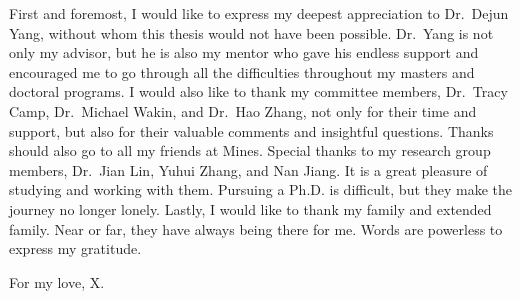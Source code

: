 \documentclass[12pt]{mines-thesis}
\begin{document}
\begin{acknowledgment}
	First and foremost, I would like to express my deepest appreciation to Dr.~Dejun Yang, without whom this thesis would not have been possible. Dr.~Yang is not only my advisor, but he is also my mentor who gave his endless support and encouraged me to go through all the difficulties throughout my masters and doctoral programs.
	I would also like to thank my committee members, Dr.~Tracy Camp, Dr.~Michael Wakin, and Dr.~Hao Zhang,  not only for their time and support, but also for their valuable comments and insightful questions. 
	Thanks should also go to all my friends at Mines. Special thanks to my research group members, Dr.~Jian Lin, Yuhui Zhang, and Nan Jiang.  It is a great pleasure of studying and working with them. Pursuing a Ph.D. is difficult, but they make the journey no longer lonely. 
	Lastly, I would like to thank my family and extended family. Near or far, they have always being there for me. Words are powerless to express my gratitude.
	
	
	
%	
%	
	 
	 
\end{acknowledgment}

\begin{dedication}
	\begin{vplace}
	\centering
	\vspace{-1in}
	For my love, X.
	\end{vplace}
\end{dedication}	


\makefrontmatter


	
\end{document}
